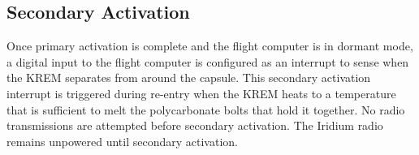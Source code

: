 \documentclass{article}
\begin{document}




\subsection{Secondary Activation}
\label{sec:secondary-activation}
Once primary activation is complete and the flight computer is in dormant mode, a digital input to the flight computer is configured as an interrupt to sense when the KREM separates from around the capsule. This secondary activation interrupt is triggered during re-entry when the KREM heats to a temperature that is sufficient to melt the polycarbonate bolts that hold it together. No radio transmissions are attempted before secondary activation. The Iridium radio remains unpowered until secondary activation.







\end{document}
